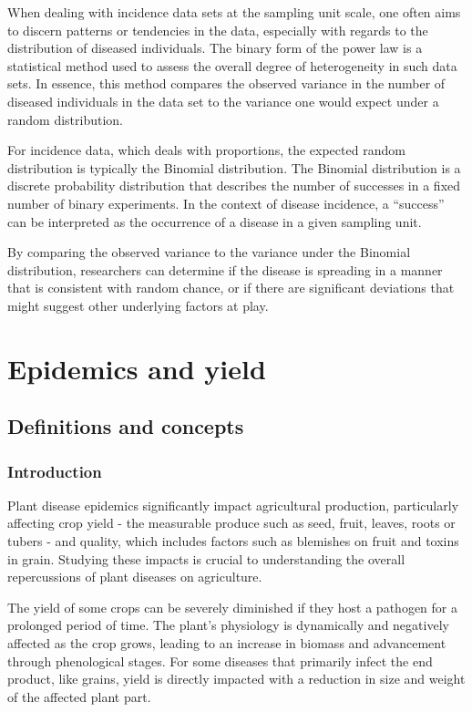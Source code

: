 \documentclass[
  letterpaper,
]{book}
\begin{document}
When dealing with incidence data sets at the sampling unit scale, one
often aims to discern patterns or tendencies in the data, especially
with regards to the distribution of diseased individuals. The binary
form of the power law is a statistical method used to assess the overall
degree of heterogeneity in such data sets. In essence, this method
compares the observed variance in the number of diseased individuals in
the data set to the variance one would expect under a random
distribution.

For incidence data, which deals with proportions, the expected random
distribution is typically the Binomial distribution. The Binomial
distribution is a discrete probability distribution that describes the
number of successes in a fixed number of binary experiments. In the
context of disease incidence, a ``success'' can be interpreted as the
occurrence of a disease in a given sampling unit.

By comparing the observed variance to the variance under the Binomial
distribution, researchers can determine if the disease is spreading in a
manner that is consistent with random chance, or if there are
significant deviations that might suggest other underlying factors at
play.

\part{Epidemics and yield}

\hypertarget{definitions-and-concepts}{%
\chapter{Definitions and concepts}\label{definitions-and-concepts}}

\hypertarget{introduction-3}{%
\section{Introduction}\label{introduction-3}}

Plant disease epidemics significantly impact agricultural production,
particularly affecting crop yield - the measurable produce such as seed,
fruit, leaves, roots or tubers - and quality, which includes factors
such as blemishes on fruit and toxins in grain. Studying these impacts
is crucial to understanding the overall repercussions of plant diseases
on agriculture.

The yield of some crops can be severely diminished if they host a
pathogen for a prolonged period of time. The plant's physiology is
dynamically and negatively affected as the crop grows, leading to an
increase in biomass and advancement through phenological stages. For
some diseases that primarily infect the end product, like grains, yield
is directly impacted with a reduction in size and weight of the affected
plant part.
\end{document}

